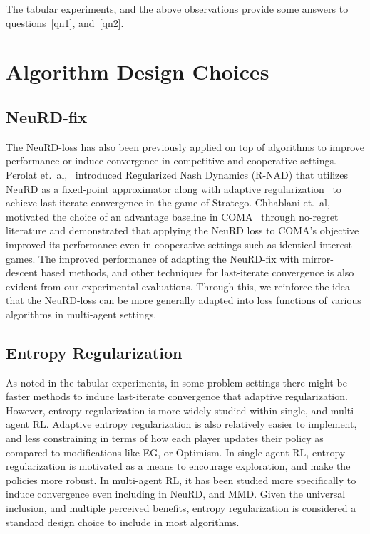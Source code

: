 The tabular experiments, and the above observations provide some answers to questions~\ref{qn1},
and~\ref{qn2}.

\section{Algorithm Design Choices}

\subsection{NeuRD-fix}
The NeuRD-loss has also been previously applied on top of algorithms to improve performance or
induce convergence in competitive and cooperative settings.
Perolat et.~al,~\cite{perolatMastering2022} introduced Regularized Nash Dynamics (R-NAD) that
utilizes NeuRD as a fixed-point approximator along with adaptive
regularization~\cite{perolatPoincare2021} to achieve last-iterate convergence in the game of
Stratego.
Chhablani et.~al,~\cite{chhablaniCounterfactual2021} motivated the choice of an advantage baseline
in COMA~\cite{foersterCounterfactual2018} through no-regret literature and demonstrated that
applying the NeuRD loss to COMA's objective improved its performance even in cooperative settings
such as identical-interest games.
The improved performance of adapting the NeuRD-fix with mirror-descent based methods, and other
techniques for last-iterate convergence is also evident from our experimental evaluations.
Through this, we reinforce the idea that the NeuRD-loss can be more generally adapted into loss
functions of various algorithms in multi-agent settings.

\subsection{Entropy Regularization}
As noted in the tabular experiments, in some problem settings there might be faster methods to
induce last-iterate convergence that adaptive regularization.
However, entropy regularization is more widely studied within single, and multi-agent RL.
Adaptive entropy regularization is also relatively easier to implement, and less constraining in
terms of how each player updates their policy as compared to modifications like EG, or Optimism.
In single-agent RL, entropy regularization is motivated as a means to encourage exploration, and
make the policies more robust.
In multi-agent RL, it has been studied more specifically to induce convergence even including in
NeuRD, and MMD.
Given the universal inclusion, and multiple perceived benefits, entropy regularization is
considered a standard design choice to include in most algorithms.

